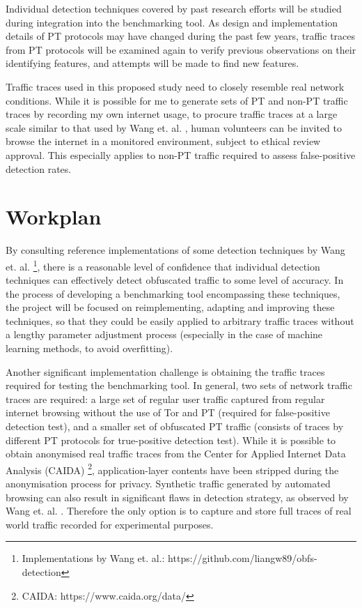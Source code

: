 \documentclass[11pt]{article}
\begin{document}
Individual detection techniques covered by past research efforts will be studied during integration into the benchmarking tool. As design and implementation details of PT protocols may have changed during the past few years, traffic traces from PT protocols will be examined again to verify previous observations on their identifying features, and attempts will be made to find new features.

Traffic traces used in this proposed study need to closely resemble real network conditions. While it is possible for me to generate sets of PT and non-PT traffic traces by recording my own internet usage, to procure traffic traces at a large scale similar to that used by Wang et. al. \cite{wang2015seeing}, human volunteers can be invited to browse the internet in a monitored environment, subject to ethical review approval. This especially applies to non-PT traffic required to assess false-positive detection rates.


\section{Workplan}

By consulting reference implementations of some detection techniques by Wang et. al. \cite{wang2015seeing} \footnote{Implementations by Wang et. al.: https://github.com/liangw89/obfs-detection}, there is a reasonable level of confidence that individual detection techniques can effectively detect obfuscated traffic to some level of accuracy.  In the process of developing a benchmarking tool encompassing these techniques, the project will be focused on reimplementing, adapting and improving these techniques, so that they could be easily applied to arbitrary traffic traces without a lengthy parameter adjustment process (especially in the case of machine learning methods, to avoid overfitting). 

Another significant implementation challenge is obtaining the traffic traces required for testing the benchmarking tool. In general, two sets of network traffic traces are required: a large set of regular user traffic captured from regular internet browsing without the use of Tor and PT (required for false-positive detection test), and a smaller set of obfuscated PT traffic (consists of traces by different PT protocols for true-positive detection test). While it is possible to obtain anonymised real traffic traces from the Center for Applied Internet Data Analysis (CAIDA) \footnote{CAIDA: https://www.caida.org/data/}, application-layer contents have been stripped during the anonymisation process for privacy. Synthetic traffic generated by automated browsing can also result in significant flaws in detection strategy, as observed by Wang et. al. \cite[Sec. 6.1]{wang2015seeing}. Therefore the only option is to capture and store full traces of real world traffic recorded for experimental purposes.
\end{document}

